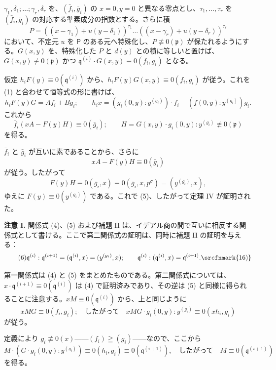\(\gamma_1,\delta_1;\ldots;\gamma_r,\delta_r\) を、\((\bar f_i,\bar g_i)\) の \(x=0, y=0\) と異なる零点とし、\(\tau_1,\ldots,\tau_r\) を \((\bar f_i,\bar g_i)\) の対応する準素成分の指数とする。さらに積
\[
P=((x-\gamma_1)+u(y-\delta_1))^{\tau_1}\ldots
((x-\gamma_r)+u(y-\delta_r))^{\tau_r}
\]
において、不定元 \(u\) を \(\mathsf P\) のある元へ特殊化し、\(P\not\equiv0(\mathfrak{p})\) が保たれるようにする。\(G(x,y)\) を、特殊化した \(P\) と \(d(y)\) との積に等しいと置けば、\(G(x,y)\not\equiv0(\mathfrak{p})\) かつ \(\mathfrak{q}^{(i)}\cdot G(x,y)\equiv0(f_i,g_i)\) となる。

仮定 \(h_iF(y)\equiv0(\mathfrak{q}^{(i)})\) から、\(h_iF(y)G(x,y)\equiv0(f_i,g_i)\) が従う。これを (1) と合わせて恒等式の形に書けば、
\[
h_iF(y)G=A f_i+B g_i;\qquad
h_ix=(g_i(0,y):y^{(g_i)})\cdot f_i
-(f(0,y):y^{(g_i)})g_i.
\]
これから
\[
\bar f_i(xA-F(y)H)\equiv0(\bar g_i);\qquad
H=G(x,y)\cdot g_i(0,y):y^{(g_i)}\not\equiv0(\mathfrak{p})
\]
を得る。

\(\bar f_i\) と \(\bar g_i\) が互いに素であることから、さらに
\[
xA-F(y)H\equiv0(\bar g_i)
\]
が従う。したがって
\[
F(y)H\equiv0(\bar g_i,x)
\equiv0(\bar g_i,x,p^\sigma)=(y^{(g_i)},x),
\]
ゆえに \(F(y)\equiv0(y^{(g_i)})\) である。これで (5)、したがって定理 IV が証明された。

\textbf{注意 I.} 関係式 (4)、(5) および補題 II は、イデアル商の間で互いに相反する関係式として書ける。ここで第二関係式の証明は、同時に補題 II の証明を与える：
\begin{equation}
\tag{6}
\mathfrak{q}^{(i)}:\mathfrak{q}^{(i+1)}=(\mathfrak{q}^{(i)},x)=(y^{(g_i)},x);\qquad
\mathfrak{q}^{(i)}:(\mathfrak{q}^{(i)},x)=\mathfrak{q}^{(i+1)}.\srcfnmark{16)}
\end{equation}

第一関係式は (4) と (5) をまとめたものである。第二関係式については、\(x\cdot \mathfrak{q}^{(i+1)}\equiv0(\mathfrak{q}^{(i)})\) は (4) で証明済みであり、その逆は (5) と同様に得られることに注意する。\(xM\equiv0(\mathfrak{q}^{(i)})\) から、上と同じように
\[
xMG\equiv0(f_i,g_i);\quad\text{したがって}\quad
xMG\cdot g_i(0,y):y^{(g_i)}\equiv0(xh_i,g_i)
\]
が従う。

定義により \(g_i\not\equiv0(x)\)――\((f_i)\geqq(g_i)\)――なので、ここから
\[
M\cdot(G\cdot g_i(0,y):y^{(g_i)})
\equiv0(h_i,g_i)\equiv0(\mathfrak{q}^{(i+1)}),
\quad\text{したがって}\quad M\equiv0(\mathfrak{q}^{(i+1)})
\]
を得る。

